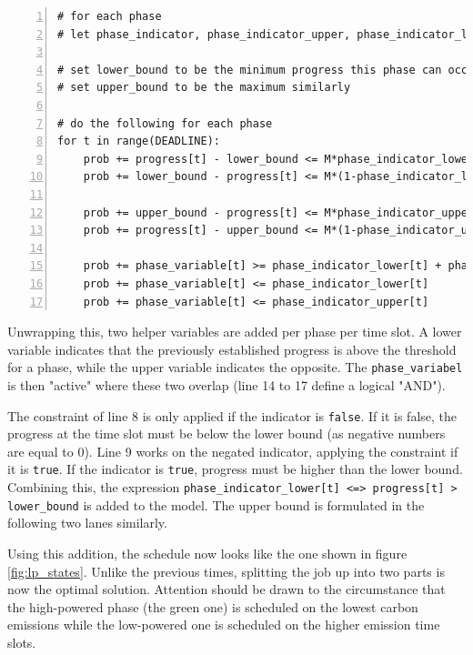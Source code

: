 \begin{lstlisting}[frame=single, numbers=left, caption={Phase detection in LP}, label={list:lp_phases}, basicstyle=\ttfamily, breaklines]
# for each phase
# let phase_indicator, phase_indicator_upper, phase_indicator_lower be DEADLINE-many boolean variables

# set lower_bound to be the minimum progress this phase can occur in 
# set upper_bound to be the maximum similarly

# do the following for each phase
for t in range(DEADLINE):
    prob += progress[t] - lower_bound <= M*phase_indicator_lower[t]
    prob += lower_bound - progress[t] <= M*(1-phase_indicator_lower[t])

    prob += upper_bound - progress[t] <= M*phase_indicator_upper[t]
    prob += progress[t] - upper_bound <= M*(1-phase_indicator_upper[t])

    prob += phase_variable[t] >= phase_indicator_lower[t] + phase_indicator_upper[t] - 1
    prob += phase_variable[t] <= phase_indicator_lower[t]
    prob += phase_variable[t] <= phase_indicator_upper[t]
\end{lstlisting}

Unwrapping this, two helper variables are added per phase per time slot. 
A lower variable indicates that the previously established progress is above the threshold for a phase, while the upper variable indicates the opposite. 
The \verb|phase_variabel| is then "active" where these two overlap (line 14 to 17 define a logical "AND").

The constraint of line 8 is only applied if the indicator is \verb|false|.
If it is false, the progress at the time slot must be below the lower bound (as negative numbers are equal to 0).
Line 9 works on the negated indicator, applying the constraint if it is \verb|true|. 
If the indicator is \verb|true|, progress must be higher than the lower bound. 
Combining this, the expression \verb|phase_indicator_lower[t] <=> progress[t] > lower_bound| is added to the model. 
The upper bound is formulated in the following two lanes similarly.

Using this addition, the schedule now looks like the one shown in figure \ref{fig:lp_states}. 
Unlike the previous times, splitting the job up into two parts is now the optimal solution. 
Attention should be drawn to the circumstance that the high-powered phase (the green one) is scheduled on the lowest carbon emissions while the low-powered one is scheduled on the higher emission time slots.

